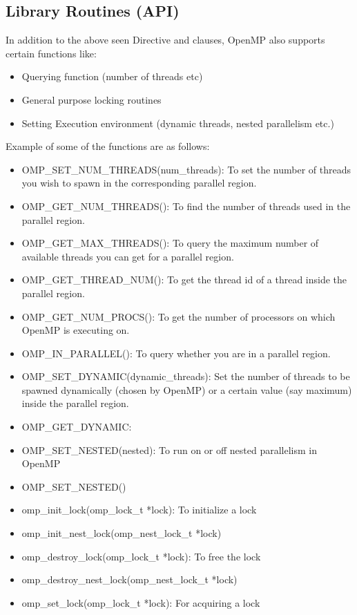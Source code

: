 \documentclass[12pt]{article}
\begin{document}
\subsection{Library Routines (API)}
In addition to the above seen Directive and clauses, OpenMP also supports certain functions like:
\begin{itemize}
    \item Querying function (number of threads etc)
    \item General purpose locking routines
    \item Setting Execution environment (dynamic threads, nested parallelism etc.)
\end{itemize}
Example of some of the functions are as follows:
\begin{itemize}
    \item OMP\_SET\_NUM\_THREADS(num\_threads): To set the number of threads you wish to spawn in the corresponding parallel region.
    \item OMP\_GET\_NUM\_THREADS(): To find the number of threads used in the parallel region.
    \item OMP\_GET\_MAX\_THREADS(): To query the maximum number of available threads you can get for a parallel region.
    \item OMP\_GET\_THREAD\_NUM(): To get the thread id of a thread inside the parallel region.
    \item OMP\_GET\_NUM\_PROCS(): To get the number of processors on which OpenMP is executing on.
    \item OMP\_IN\_PARALLEL(): To query whether you are in a parallel region.
    \item OMP\_SET\_DYNAMIC(dynamic\_threads): Set the number of threads to be spawned dynamically (chosen by OpenMP) or a certain value (say maximum) inside the parallel region.
    \item OMP\_GET\_DYNAMIC: 
    \item OMP\_SET\_NESTED(nested): To run on or off nested parallelism in OpenMP
    \item OMP\_SET\_NESTED()
    \item omp\_init\_lock(omp\_lock\_t *lock): To initialize a lock
    \item omp\_init\_nest\_lock(omp\_nest\_lock\_t *lock)
    \item omp\_destroy\_lock(omp\_lock\_t *lock): To free the lock
    \item omp\_destroy\_nest\_lock(omp\_nest\_lock\_t *lock)
    \item omp\_set\_lock(omp\_lock\_t *lock): For acquiring a lock

\end{itemize}
\end{document}
